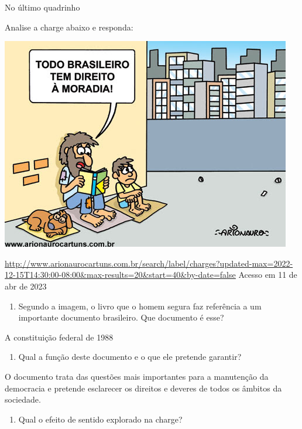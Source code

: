 {No último quadrinho

Analise a charge abaixo e responda:

\includegraphics[width=5in,height=3.65625in]{./imgSAEB_7_POR/media/image5.png}

\href{http://www.arionaurocartuns.com.br/search/label/charges?updated-max=2022-12-15T14:30:00-08:00\&max-results=20\&start=40\&by-date=false}{\uline{http://www.arionaurocartuns.com.br/search/label/charges?updated-max=2022-12-15T14:30:00-08:00\&max-results=20\&start=40\&by-date=false}}
Acesso em 11 de abr de 2023

\begin{enumerate}
\def\labelenumi{\arabic{enumi})}
\setcounter{enumi}{6}
\tightlist
\item
  Segundo a imagem, o livro que o homem segura faz referência a um
  importante documento brasileiro. Que documento é esse?
\end{enumerate}

A constituição federal de 1988

\begin{enumerate}
\def\labelenumi{\arabic{enumi})}
\setcounter{enumi}{7}
\tightlist
\item
  Qual a função deste documento e o que ele pretende garantir?
\end{enumerate}

O documento trata das questões mais importantes para a manutenção da
democracia e pretende esclarecer os direitos e deveres de todos os
âmbitos da sociedade.

\begin{enumerate}
\def\labelenumi{\arabic{enumi})}
\setcounter{enumi}{8}
\tightlist
\item
  Qual o efeito de sentido explorado na charge?
\end{enumerate}

}
